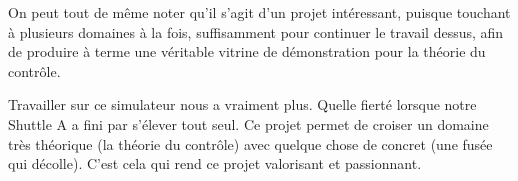 \documentclass[a4paper,11pt]{article}
\begin{document}
    On peut tout de même noter qu'il s'agit d'un projet intéressant, puisque touchant à plusieurs domaines à la fois, suffisamment pour continuer le travail dessus, afin de produire à terme une véritable vitrine de démonstration pour la théorie du contrôle.
		
		Travailler sur ce simulateur nous a vraiment plus. Quelle fierté lorsque notre Shuttle A a fini par s'élever tout seul. 
		Ce projet permet de croiser un domaine très théorique (la théorie du contrôle) avec quelque chose de concret (une fusée qui décolle). C'est cela qui rend ce projet valorisant et passionnant.


\end{document}
